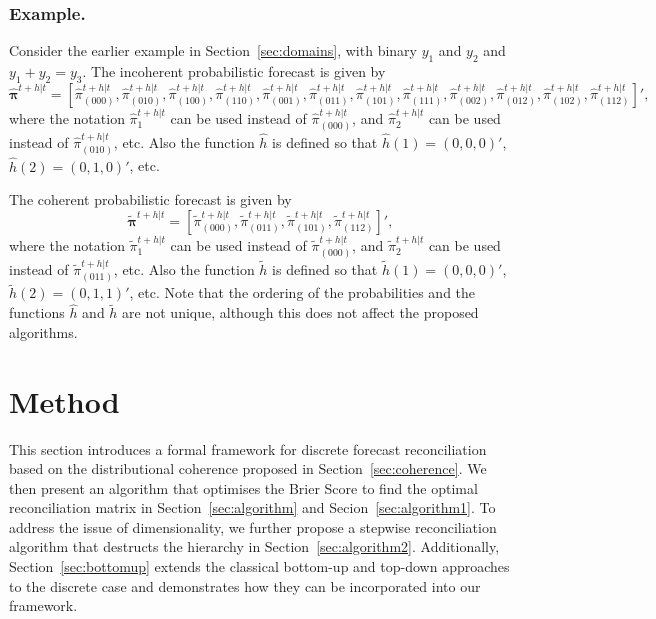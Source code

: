 \documentclass[a4paper,review,12pt,authoryear]{elsarticle}
\newcommand{\bpi}{\bm{\pi}}
\begin{document}
  \subsubsection*{\textbf{Example}.}
  
  Consider the earlier example in Section~\ref{sec:domains}, with binary $y_1$ and $y_2$ and $y_1+y_2=y_3$. The incoherent probabilistic forecast is given by
  \[
    \hat{\bpi}^{t+h|t}= \left[       
      \hat{\pi}^{t+h|t}_{(000)},
       \hat{\pi}^{t+h|t}_{(010)},
       \hat{\pi}^{t+h|t}_{(100)},
       \hat{\pi}^{t+h|t}_{(110)},
       \hat{\pi}^{t+h|t}_{(001)},
       \hat{\pi}^{t+h|t}_{(011)},
       \hat{\pi}^{t+h|t}_{(101)},
       \hat{\pi}^{t+h|t}_{(111)},
       \hat{\pi}^{t+h|t}_{(002)},
       \hat{\pi}^{t+h|t}_{(012)},
       \hat{\pi}^{t+h|t}_{(102)},
       \hat{\pi}^{t+h|t}_{(112)}
       \right]',
  \]
  where the notation $\hat{\pi}^{t+h|t}_{1}$ can be used instead of $\hat{\pi}^{t+h|t}_{(000)}$, and $\hat{\pi}^{t+h|t}_{2}$ can be used instead of $\hat{\pi}^{t+h|t}_{(010)}$, etc. Also the function $\hat{h}$ is defined so that $\hat{h}(1)=(0,0,0)'$, $\hat{h}(2)=(0,1,0)'$, etc.
  
  The coherent probabilistic forecast is given by
  \[
  \tilde{\bpi}^{t+h|t}=\left[
  \tilde{\pi}^{t+h|t}_{(000)},
  \tilde{\pi}^{t+h|t}_{(011)},
  \tilde{\pi}^{t+h|t}_{(101)},
  \tilde{\pi}^{t+h|t}_{(112)}
  \right]',\]
  where the notation $\tilde{\pi}^{t+h|t}_{1}$ can be used instead of $\tilde{\pi}^{t+h|t}_{(000)}$, and $\tilde{\pi}^{t+h|t}_{2}$ can be used instead of $\tilde{\pi}^{t+h|t}_{(011)}$, etc. Also the function $\tilde{h}$ is defined so that $\tilde{h}(1)=(0,0,0)'$, $\tilde{h}(2)=(0,1,1)'$, etc. Note that the ordering of the probabilities and the functions $\hat{h}$ and $\tilde{h}$ are not unique, although this does not affect the proposed algorithms.

\section{Method}
\label{sec:method}

This section introduces a formal framework for discrete forecast reconciliation based on the distributional coherence proposed in Section~\ref{sec:coherence}.
We then present an algorithm that optimises the Brier Score to find the optimal reconciliation matrix in Section~\ref{sec:algorithm} and Secion~\ref{sec:algorithm1}.
To address the issue of dimensionality, we further propose a stepwise reconciliation algorithm that destructs the hierarchy in Section~\ref{sec:algorithm2}.
Additionally, Section~\ref{sec:bottomup} extends the classical bottom-up and top-down approaches to the discrete case and demonstrates how they can be incorporated into our framework.
\end{document}
